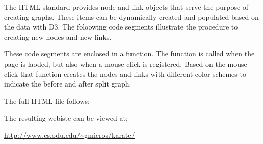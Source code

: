 


The HTML standard provides node and link objects that serve the purpose of creating graphs. These items can be dynamically created and populated based on the data with D3. The foloowing code segments illustrate the procedure to creating new nodes and new links. 










These code segments are enclosed in a function. The function is called when the page is laoded, but also when a mouse click is registered. Based on the mouse click that function creates the nodes and links with different color schemes to indicate the before and after split graph. 

The full HTML file follows:





The resulting webiste can be viewed at:

\url{http://www.cs.odu.edu/~gmicros/karate/}



%
%
%






